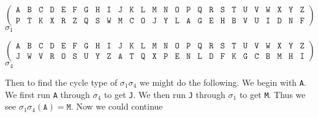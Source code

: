 \begin{center}
  \[
    \left(
      \begin{array}{llllllllllllllllllllllllll}
        \texttt{A} & \texttt{B} & \texttt{C} & \texttt{D} &
        \texttt{E} & \texttt{F} & \texttt{G} & \texttt{H} &
        \texttt{I} & \texttt{J} & \texttt{K} & \texttt{L} &
        \texttt{M} & \texttt{N} & \texttt{O} & \texttt{P} &
        \texttt{Q} & \texttt{R} & \texttt{S} & \texttt{T} &
        \texttt{U} & \texttt{V} & \texttt{W} & \texttt{X} &
        \texttt{Y} & \texttt{Z}                             \\
        \texttt{P} & \texttt{T} & \texttt{K} & \texttt{X} &
        \texttt{R} & \texttt{Z} & \texttt{Q} & \texttt{S} &
        \texttt{W} & \texttt{M} & \texttt{C} & \texttt{O} &
        \texttt{J} & \texttt{Y} & \texttt{L} & \texttt{A} &
        \texttt{G} & \texttt{E} & \texttt{H} & \texttt{B} &
        \texttt{V} & \texttt{U} & \texttt{I} & \texttt{D} &
        \texttt{N} & \texttt{F}
      \end{array}
    \right)
  \]
  $\sigma_1$
\end{center}
\begin{center}
  \[
    \left(
      \begin{array}{llllllllllllllllllllllllll}
        \texttt{A} & \texttt{B} & \texttt{C} & \texttt{D} &
        \texttt{E} & \texttt{F} & \texttt{G} & \texttt{H} &
        \texttt{I} & \texttt{J} & \texttt{K} & \texttt{L} &
        \texttt{M} & \texttt{N} & \texttt{O} & \texttt{P} &
        \texttt{Q} & \texttt{R} & \texttt{S} & \texttt{T} &
        \texttt{U} & \texttt{V} & \texttt{W} & \texttt{X} &
        \texttt{Y} & \texttt{Z}                             \\
        \texttt{J} & \texttt{W} & \texttt{V} & \texttt{R} &
        \texttt{O} & \texttt{S} & \texttt{U} & \texttt{Y} &
        \texttt{Z} & \texttt{A} & \texttt{T} & \texttt{Q} &
        \texttt{X} & \texttt{P} & \texttt{E} & \texttt{N} &
        \texttt{L} & \texttt{D} & \texttt{F} & \texttt{K} &
        \texttt{G} & \texttt{C} & \texttt{B} & \texttt{M} &
        \texttt{H} & \texttt{I}
      \end{array}
    \right)
  \]
  $\sigma_4$
\end{center}
Then to find the cycle type of $\sigma_1\sigma_4$ we might do the
following. We begin with \texttt{A}. We first run \texttt{A} through
$\sigma_4$ to get \texttt{J}. We then run \texttt{J} through
$\sigma_1$ to get \texttt{M}. Thus we see
$\sigma_1\sigma_4(\texttt{A}) = \texttt{M}$. Now we could continue
